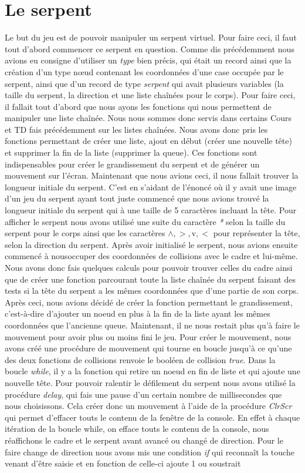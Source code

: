\documentclass[12pt]{article}
\begin{document}
\section{Le serpent}
Le but du jeu est de pouvoir manipuler un serpent virtuel. Pour faire ceci, il faut tout d'abord commencer ce serpent en question. Comme dis précédemment nous avions eu consigne d'utiliser un \emph{type} bien précis, qui était un record ainsi que la création d'un type nœud contenant les coordonnées d'une case occupée par le serpent, ainsi que d'un record de type \emph{serpent} qui avait plusieurs variables (la taille du serpent, la direction et une liste chaînées pour le corps). Pour faire ceci, il fallait tout d'abord que nous ayons les fonctions qui nous permettent de manipuler une liste chaînée. Nous nous sommes donc servis dans certains Cours et TD fais précédemment sur les listes chaînées. Nous avons donc pris les fonctions permettant de créer une liste, ajout en début (créer une nouvelle tête) et supprimer la fin de la liste (supprimer la queue). Ces fonctions sont indispensables pour créer le grandissement du serpent et de générer un mouvement sur l'écran. Maintenant que nous avions ceci, il nous fallait trouver la longueur initiale du serpent. C'est en s'aidant de l'énoncé où il y avait une image d'un jeu du serpent ayant tout juste commencé que nous avions trouvé la longueur initiale du serpent qui à une taille de 5 caractères incluant la tête. Pour afficher le serpent nous avons utilisé une suite du  caractère \emph{*} selon la taille du serpent pour le corps ainsi que les caractères $\wedge, >,$v$ ,<$ pour représenter la tête, selon la direction du serpent. Après avoir initialisé le serpent, nous avions ensuite commencé à nousoccuper des coordonnées de collisions avec le cadre et lui-même. Nous avons donc fais quelques calculs pour pouvoir trouver celles du cadre ainsi que de créer une fonction parcourant toute la liste chaînée du serpent faisant des tests si la tête du serpent a les mêmes coordonnées que d'une partie de son corps. Après ceci, nous avions décidé de créer la fonction permettant le grandissement, c'est-à-dire d'ajouter un noeud en plus à la fin de la liste ayant les mêmes coordonnées que l'ancienne queue. Maintenant, il ne nous restait plus qu'à faire le mouvement pour avoir plus ou moins fini le jeu. Pour créer le mouvement, nous avons créé une procédure de mouvement qui tourne en boucle jusqu'à ce qu'une des deux fonctions de collisions renvoie le booléen de collision \emph{true}. Dans la boucle \emph{while}, il y a la fonction qui retire un noeud en fin de liste et qui ajoute une nouvelle tête. Pour pouvoir ralentir le défilement du serpent nous avons utilisé la procédure \emph{delay}, qui fais une pause d'un certain nombre de millisecondes que nous choisissons. Cela créer donc un mouvement à l'aide de la procédure \emph{ClrScr} qui permet d'effacer touts le contenu de la fenêtre de la console. En effet à chaque itération de la boucle while, on efface touts le contenu de la console, nous réaffichons le cadre et le serpent avant avancé ou changé de direction. Pour le faire change de direction nous avons mis une condition \emph{if} qui reconnaît la touche venant d'être saisie et en fonction de celle-ci ajoute 1 ou soustrait 
\end{document}
